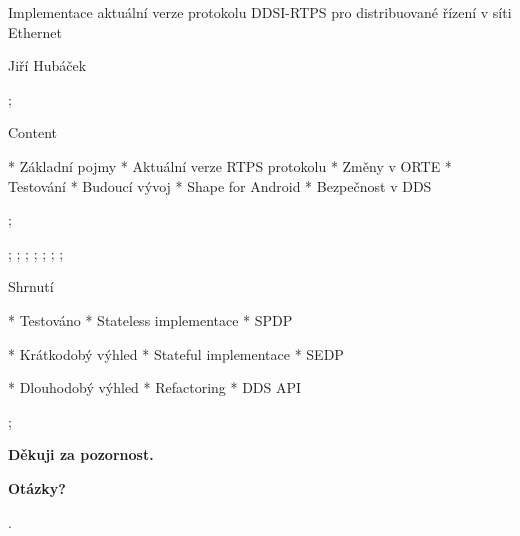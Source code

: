 

\worktype[M/CZ]

\slideshow

\tit Implementace aktuální verze protokolu DDSI-RTPS pro distribuované řízení v síti Ethernet

\subtit Jiří Hubáček

\pg;


\sec Content

* Základní pojmy
* Aktuální verze RTPS protokolu
* Změny v ORTE
* Testování
* Budoucí vývoj
* Shape for Android
* Bezpečnost v DDS

\pg;

 \pg;
 \pg;
 \pg;
 \pg;
 \pg;
 \pg;
 \pg;


\sec Shrnutí

* Testováno
\begitems
* Stateless implementace
* SPDP
\enditems

* Krátkodobý výhled
\begitems
* Stateful implementace
* SEDP
\enditems

* Dlouhodobý výhled
\begitems
* Refactoring
* DDS API
\enditems

\pg;

\null
\vskip2cm
\centerline{\typosize[35/40]\bf Děkuji za pozornost.}

\vskip2cm
\centerline{\Blue\typosize[60/70]\bf Otázky?}

\pg.
